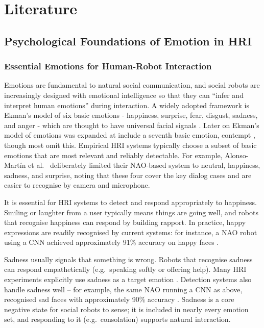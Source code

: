 \chapter{Literature}

\section{Psychological Foundations of Emotion in HRI}

\subsection{Essential Emotions for Human-Robot Interaction}

Emotions are fundamental to natural social communication, and social robots are increasingly designed with emotional intelligence so that they can ``infer and interpret human emotions'' during interaction. A widely adopted framework is Ekman's model of six basic emotions - happiness, surprise, fear, disgust, sadness, and anger - which are thought to have universal facial signals \cite{Reyes2019-go}. Later on Ekman's model of emotions was expanded at include a seventh basic emotion, contempt \cite{Matsumoto1992-jf}, though most omit this. Empirical HRI systems typically choose a subset of basic emotions that are most relevant and reliably detectable. For example, Alonso-Martín et al.\ \cite{Alonso-Martin2013-cv} deliberately limited their NAO-based system to neutral, happiness, sadness, and surprise, noting that these four cover the key dialog cases and are easier to recognise by camera and microphone.

It is essential for HRI systems to detect and respond appropriately to happiness. Smiling or laughter from a user typically means things are going well, and robots that recognise happiness can respond by building rapport. In practice, happy expressions are readily recognised by current systems: for instance, a NAO robot using a CNN achieved approximately 91\% accuracy on happy faces \cite{Filippini2021-ni}.

Sadness usually signals that something is wrong. Robots that recognise sadness can respond empathetically (e.g.\ speaking softly or offering help). Many HRI experiments explicitly use sadness as a target emotion \cite{Stock-Homburg2022-wd}. Detection systems also handle sadness well -- for example, the same NAO running a CNN as above, recognised sad faces with approximately 90\% accuracy \cite{Filippini2021-ni}. Sadness is a core negative state for social robots to sense; it is included in nearly every emotion set, and responding to it (e.g.\ consolation) supports natural interaction.

